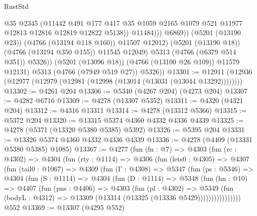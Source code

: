 \begin{lexlean}{RustStd}
\begin{coremodule}
                              @35
                              @2345
                              (@11442
                                @491
                                @177
                                @417
                                @35
                                @1059
                                @2165
                                @1079
                                @521
                                @11977
                                @12813
                                @12816
                                @12819
                                @12822
                                @5138))
                            @11484)))
                      @6869))
                  (@5201 (@13190 @23))
                  (@4766 (@13194 @118 @160))
                  @11507
                  @12012)
                (@5201 (@13190 @18))
                (@4766 (@13194 @350 @155))
                @11545
                @12049)
              @5313
              (@4766 (@6379 @514 @351))
              @5326))
          (@5201 (@13096 @18))
          (@4766 (@13100 @26 @109))
          @11579
          @12131)
        @5313
        (@4766 (@7949 @519 @27))
        @5326))
@13301 := @12911 (@12936 (@12977 (@12979 (@12981 (@12998 (@13014 (@13031 (@13044 @13292))))))))
@13302 := @4261 @204
@13306 := @5340 (@4267 @204) (@4273 @204)
@13307 := @4282 @6716
@13309 := @4278 (@13307 @5352)
@13311 := @4320 (@4321 @204)
@13312 := @4316 @13311
@13314 := @4278 (@13312 @5366)
@13315 := @5372 @204
@13320 := @13315 @5374 @4360 @4332 @4336 @4339
@13325 := @4278 (@5371 (@13320 @5380 @5385) @5392)
@13326 := @5395 @204
@13331 := @13326 @5374 @4360 @4332 @4336 @4339
@13336 := @4278 (@4409 (@13331 @5380 @5385) @1085)
@13367 := @4277
    (fun (fn : @7) =>
    @4303
      (fun (rc : @4302) =>
      @4304
        (fun (rty : @1114) =>
        @4306
          (fun (lets0 : @4305) =>
          @4307
            (fun (tail0 : @1067) =>
            @4309
              (fun (Γ : @4308) =>
              @5347
                (fun (ps : @5346) =>
                @4304
                  (fun (S : @1114) =>
                  @4304
                    (fun (D : @1114) =>
                    @5348
                      (fun (hn : @10) =>
                      @4407
                        (fun (pns : @4406) =>
                        @4303
                          (fun (pl : @4302) =>
                          @5349
                            (fun (bodyL : @4312) =>
                            @13309 (@13314 (@13325 (@13336 @5429))))))))))))))))
    @552
@13369 := @13307 (@4295 @552)

\end{coremodule}
\end{lexlean}

